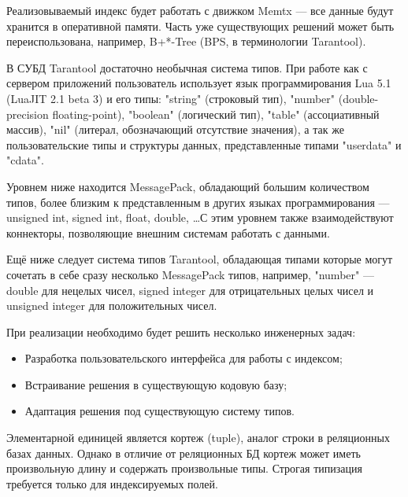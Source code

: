 Реализовываемый индекс будет работать с движком Memtx ---
все данные будут хранится в оперативной памяти.
Часть уже существующих решений может быть переиспользована, например,
B+*-Tree (BPS, в терминологии Tarantool).

В СУБД Tarantool достаточно необычная система типов.
При работе как с сервером приложений пользователь использует язык программирования
Lua 5.1 (LuaJIT 2.1 beta 3) и его типы: "string" (строковый тип),
"number" (double-precision floating-point),
"boolean" (логический тип),
"table" (ассоциативный массив),
"nil" (литерал, обозначающий отсутствие значения),
а так же пользовательские типы и структуры данных,
представленные типами "userdata" и "cdata".

Уровнем ниже находится MessagePack, обладающий большим количеством типов,
более близким к представленным в других языках программирования ---
unsigned int, signed int, float, double, \ldots С этим уровнем также взаимодействуют
коннекторы, позволяющие внешним системам работать с данными.

Ещё ниже следует система типов Tarantool, обладающая
типами которые могут сочетать в себе сразу несколько MessagePack типов, например,
"number" --- double для нецелых чисел, signed integer для отрицательных целых чисел
и unsigned integer для положительных чисел.

При реализации необходимо будет решить несколько инженерных задач:
\begin{itemize}
	\item Разработка пользовательского интерфейса для работы с индексом;
	\item Встраивание решения в существующую кодовую базу;
	\item Адаптация решения под существующую систему типов.
\end{itemize}

Элементарной единицей является кортеж (tuple), аналог строки в
реляционных базах данных. Однако в отличие от реляционных БД
кортеж может иметь произвольную длину и содержать произвольные типы.
Строгая типизация требуется только для индексируемых полей.
